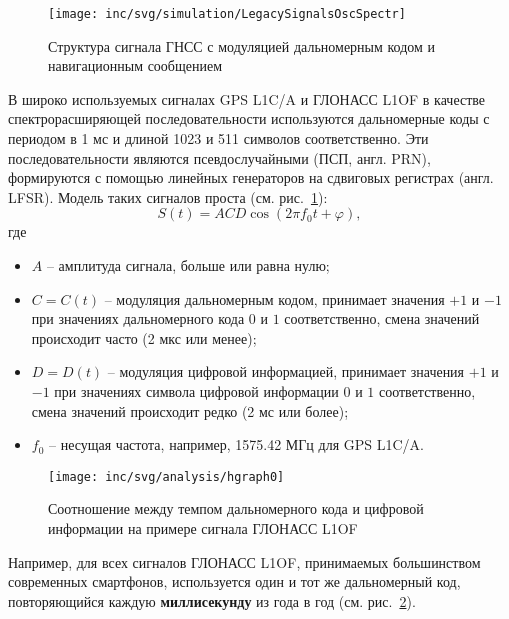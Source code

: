 \begin{figure}[ht]
  \centering
  \texttt{[image: inc/svg/simulation/LegacySignalsOscSpectr]}
  \caption{Структура сигнала ГНСС с модуляцией дальномерным кодом и навигационным сообщением}
  \label{fig:LegacySignalsOscSpectr}
\end{figure}

В широко используемых сигналах GPS L1C/A и ГЛОНАСС L1OF в качестве спектрорасширяющей последовательности используются дальномерные коды с периодом в 1 мс и длиной 1023 и 511 символов соответственно. 
Эти последовательности являются псевдослучайными (ПСП, англ. PRN), формируются с помощью линейных генераторов на сдвиговых регистрах (англ. LFSR). 
Модель таких сигналов проста (см. рис.~\ref{fig:LegacySignalsOscSpectr}):
\begin{equation}
S\left( t  \right) = A C D \cos \left( 2 \pi f_0  t  + \varphi \right),
\end{equation}
где
\begin{itemize}
\item $A$ -- амплитуда сигнала, больше или равна нулю;
\item $C = C\left( t  \right)$ -- модуляция дальномерным кодом, принимает значения $+1$ и $-1$ при значениях дальномерного кода $0$ и $1$ соответственно, смена значений происходит часто (2 мкс или менее);
\item $D = D\left( t \right)$ -- модуляция цифровой информацией, принимает значения $+1$ и $-1$ при значениях символа цифровой информации $0$ и $1$ соответственно, смена значений происходит редко (2 мс или более);
\item $f_0$ -- несущая частота, например, 1575.42 МГц для GPS L1C/A.
\end{itemize}

\begin{figure}[ht]
  \centering
  \texttt{[image: inc/svg/analysis/hgraph0]}
  \caption{Соотношение между темпом дальномерного кода и цифровой информации на примере сигнала ГЛОНАСС L1OF}
  \label{fig:hgraph0}
\end{figure}

Например, для всех сигналов ГЛОНАСС L1OF, принимаемых большинством современных смартфонов, используется один и тот же дальномерный код, повторяющийся каждую \textbf{миллисекунду} из года в год (см. рис.~\ref{fig:hgraph0}).